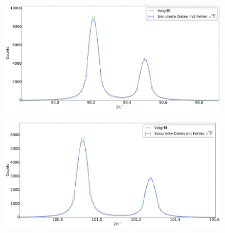 \begin{figure}[H]
\begin{minipage}{.5\textwidth}
  \centering
  \includegraphics[scale=0.15]{Simulation_Germaniumpulver_7}
  \label{fig:pul_sim_ger_7}
\end{minipage}
\hspace{0.5cm}
\begin{minipage}{.5\textwidth}
  \centering
  \includegraphics[scale=0.15]{Simulation_Germaniumpulver_8}
  \label{fig:pul_sim_ger_8}
\end{minipage}
\end{figure}
